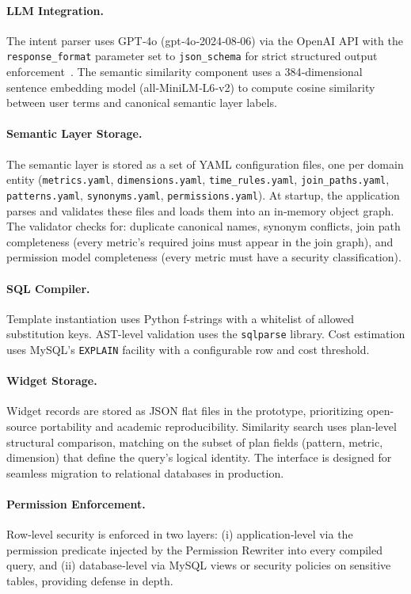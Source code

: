 \documentclass[11pt]{article}
\begin{document}
\paragraph{LLM Integration.} The intent parser uses GPT‑4o (gpt‑4o‑2024‑08‑06) via the OpenAI API with the \texttt{response\_format} parameter set to \texttt{json\_schema} for strict structured output enforcement~\cite{openai2024structured}. The semantic similarity component uses a 384‑dimensional sentence embedding model (all‑MiniLM‑L6‑v2) to compute cosine similarity between user terms and canonical semantic layer labels.

\paragraph{Semantic Layer Storage.} The semantic layer is stored as a set of YAML configuration files, one per domain entity (\texttt{metrics.yaml}, \texttt{dimensions.yaml}, \texttt{time\_rules.yaml}, \texttt{join\_paths.yaml}, \texttt{patterns.yaml}, \texttt{synonyms.yaml}, \texttt{permissions.yaml}). At startup, the application parses and validates these files and loads them into an in‑memory object graph. The validator checks for: duplicate canonical names, synonym conflicts, join path completeness (every metric's required joins must appear in the join graph), and permission model completeness (every metric must have a security classification).

\paragraph{SQL Compiler.} Template instantiation uses Python f-strings with a whitelist of allowed substitution keys. AST-level validation uses the \texttt{sqlparse} library. Cost estimation uses MySQL's \texttt{EXPLAIN} facility with a configurable row and cost threshold.

\paragraph{Widget Storage.} Widget records are stored as JSON flat files in the prototype, prioritizing open-source portability and academic reproducibility. Similarity search uses plan-level structural comparison, matching on the subset of plan fields (pattern, metric, dimension) that define the query's logical identity. The interface is designed for seamless migration to relational databases in production.

\paragraph{Permission Enforcement.} Row‑level security is enforced in two layers: (i) application‑level via the permission predicate injected by the Permission Rewriter into every compiled query, and (ii) database‑level via MySQL views or security policies on sensitive tables, providing defense in depth.
\end{document}
